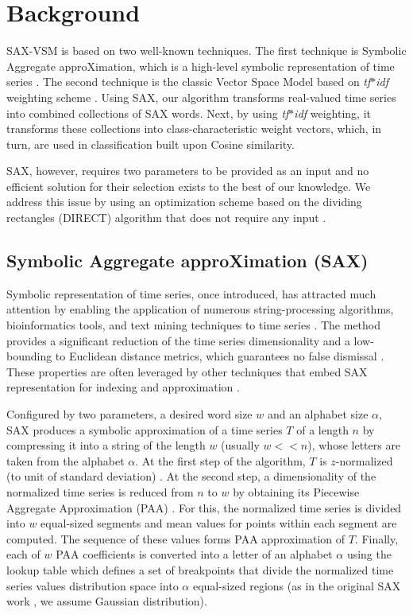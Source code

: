 \documentclass[conference]{IEEEtran}
\begin{document}
\section{Background} \label{background}
SAX-VSM is based on two well-known techniques. The first technique is 
Symbolic Aggregate approXimation, which is a high-level symbolic
representation of time series \cite{sax}. 
The second technique is the classic Vector Space Model based on 
\textit{tf$\ast$idf} weighting scheme \cite{salton}. 
Using SAX, our algorithm transforms real-valued time series into combined 
collections of SAX words. Next, by using \textit{tf$\ast$idf} weighting, it 
transforms these collections into class-characteristic weight vectors, 
which, in turn, are used in classification built upon Cosine similarity.

SAX, however, requires two parameters to be provided as an input and 
no efficient solution for their selection exists to the best of our knowledge. 
We address this issue by using an optimization scheme based on the dividing 
rectangles (DIRECT) algorithm that does not require any input \cite{direct}. 

\subsection{Symbolic Aggregate approXimation (SAX)} \label{section-sax}
Symbolic representation of time series, once introduced, has attracted much attention by
enabling the application of numerous string-processing algorithms, bioinformatics tools, 
and text mining techniques to time series \cite{sax}. The method provides a significant 
reduction of the time series dimensionality and a low-bounding to Euclidean distance 
metrics, which guarantees no false dismissal \cite{exp_sax}.
These properties are often leveraged by other techniques that embed SAX 
representation for indexing and approximation \cite{fast-shapelets}.

Configured by two parameters, a desired word size $w$ and an alphabet size $\alpha$,
SAX produces a symbolic approximation of a time series $T$ of a length $n$ by compressing 
it into a string of the length $w$ (usually $w<<n$), whose letters are taken from 
the alphabet $\alpha$. 
At the first step of the algorithm, $T$ is $z$-normalized (to unit of standard deviation)
\cite{goldin_kanellakis}. 
At the second step, a dimensionality of the normalized time series is reduced from $n$ to $w$ by
obtaining its Piecewise Aggregate Approximation (PAA) \cite{paa}. 
For this, the normalized time series is divided into $w$ equal-sized segments 
and mean values for points within each segment are computed.
The sequence of these values forms PAA approximation of $T$. 
Finally, each of $w$ PAA coefficients is converted into a letter of an alphabet 
$\alpha$ using the lookup table which defines a set of breakpoints that divide 
the normalized time series values distribution space into $\alpha$ equal-sized regions
(as in the original SAX work \cite{sax}, we assume Gaussian distribution).
\end{document}
